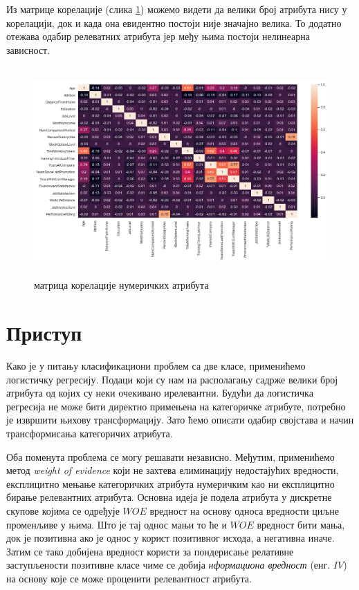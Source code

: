 \documentclass[12pt, a4paper]{article}
\begin{document}
	Из матрице корелације (слика \ref{fig:corr}) можемо видети да велики број атрибута нису у корелацији, док и када она евидентно постоји није значајно велика. То додатно отежава одабир релеватних атрибута јер међу њима постоји нелинеарна зависност.
	
	\begin{figure}[H]
		\centering
		\includegraphics[height=8cm]{graphics/full_correlation.png}
		\caption{матрица корелације нумеричких атрибута}
		\label{fig:corr}
	\end{figure}

\section{Приступ}
	Како је у питању класификациони проблем са две класе, применићемо логистичку регресију. Подаци који су нам на располагању садрже велики број атрибута од којих су неки очекивано ирелевантни. Будући да логистичка регресија не може бити директно примењена на категоричке атрибуте, потребно је извршити њихову трансформацију. Зато ћемо описати одабир својстава и начин трансформисања категоричих атрибута.
	
	Оба поменута проблема се могу решавати независно. Међутим, применићемо метод \textit{weight of evidence} који не захтева елиминацију недостајућих вредности, експлицитно мењање категоричких атрибута нумеричким као ни експлицитно бирање релевантних атрибута. Основна идеја је подела атрибута у дискретне скупове којима се одређује $WOE$ вредност на основу односа вредности циљне променљиве у њима. Што је тај однос мањи то ће и $WOE$ вредност бити мања, док је позитивна ако је однос у корист позитивног исхода, а негативна иначе. Затим се тако добијена вредност користи за пондерисање релативне заступљености позитивне класе чиме се добија \textit{нформациона вредност} (енг. $IV$) на основу које се може проценити релевантност атрибута.
	
\end{document}
